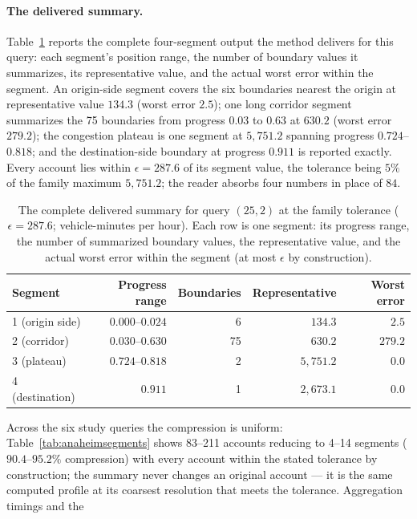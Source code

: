 \paragraph{The delivered summary.}
Table~\ref{tab:anaheimsegmentsfull} reports the complete four-segment
output the method delivers for this query: each segment's position
range, the number of boundary values it summarizes, its representative
value, and the actual worst error within the segment. An origin-side
segment covers the six boundaries nearest the origin at representative
value $134.3$ (worst error $2.5$); one long corridor segment summarizes
the 75 boundaries from progress $0.03$ to $0.63$ at $630.2$ (worst
error $279.2$); the congestion plateau is one segment at $5{,}751.2$
spanning progress $0.724$--$0.818$; and the destination-side boundary
at progress $0.911$ is reported exactly. Every account lies within
$\epsilon=287.6$ of its segment value, the tolerance being $5\%$ of
the family maximum $5{,}751.2$; the reader absorbs four numbers in
place of $84$.
\begin{table}[t]\centering\footnotesize
\caption{The complete delivered summary for query $(25,2)$ at the
family tolerance ($\epsilon=287.6$; vehicle-minutes per hour). Each row
is one segment: its progress range, the number of summarized boundary
values, the representative value, and the actual worst error within the
segment (at most $\epsilon$ by construction).}\label{tab:anaheimsegmentsfull}
\setlength{\tabcolsep}{5pt}
\begin{tabular*}{\tblwidth}{@{\extracolsep{\fill}}lrrrr}
\toprule
Segment & Progress range & Boundaries & Representative & Worst error\\
\midrule
1 (origin side) & $0.000$--$0.024$ & 6 & $134.3$ & $2.5$\\
2 (corridor) & $0.030$--$0.630$ & 75 & $630.2$ & $279.2$\\
3 (plateau) & $0.724$--$0.818$ & 2 & $5{,}751.2$ & $0.0$\\
4 (destination) & $0.911$ & 1 & $2{,}673.1$ & $0.0$\\
\bottomrule\end{tabular*}\end{table}
Across the six study queries the compression is uniform:
Table~\ref{tab:anaheimsegments} shows 83--211 accounts reducing to
4--14 segments ($90.4$--$95.2\%$ compression) with every account within
the stated tolerance by construction; the summary never changes an
original account --- it is the same computed profile at its coarsest
resolution that meets the tolerance. Aggregation timings and the
